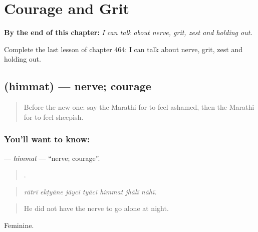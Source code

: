 
\chapter{Courage and Grit}
\label{ch:mr-courage-and-grit}

\begin{chapteropening}
\textbf{By the end of this chapter:} \emph{I can talk about nerve, grit, zest and holding out.}

Complete the last lesson of chapter 464: I can talk about nerve, grit, zest and holding out.
\end{chapteropening}

\section[\texorpdfstring{\mr{हिंमत} (himmat)}{हिंमत (himmat)}]{ (himmat) — nerve; courage}

\label{lesson:MR-C464-himmat}



\begin{quote}
Before the new one: say the Marathi for to feel ashamed, then the Marathi for to feel sheepish.
\end{quote}

\subsection*{You'll want to know: }
\textbf{} — \emph{himmat} — \textquotedblleft{}nerve; courage\textquotedblright{}.

\begin{quote}
      .
\end{quote}

\begin{quote}
\emph{rātrī ekṭyāne jāycī tyācī himmat jhālī nāhī.}
\end{quote}

\begin{quote}
He did not have the nerve to go alone at night.
\end{quote}

Feminine.

